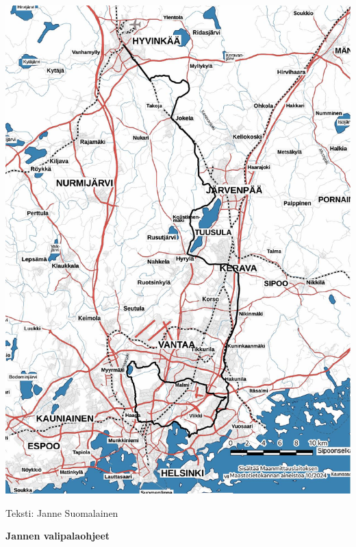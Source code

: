 \begin{multicols}{2}
\vspace*{.25cm}

\begin{Figure}
\noindent\includegraphics[width=\linewidth,trim={5.75cm 0 .75cm 0},clip]{assets/mustaliljareitti.jpg}
\end{Figure}

\vspace*{.5cm}

{\raggedleft Teksti: Janne Suomalainen\par}
\end{multicols}


\clearpage
\vspace*{-1.55cm}
\large\textbf{Jannen valipalaohjeet}

